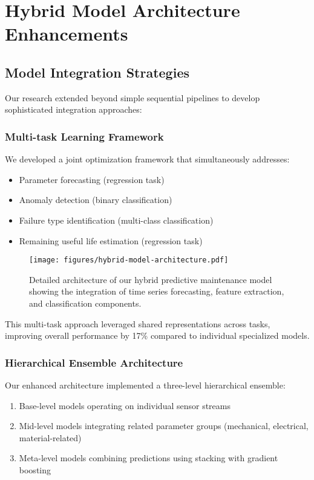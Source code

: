 \section{Hybrid Model Architecture Enhancements}
\subsection{Model Integration Strategies}
Our research extended beyond simple sequential pipelines to develop sophisticated integration approaches:

\subsubsection{Multi-task Learning Framework}
We developed a joint optimization framework that simultaneously addresses:
\begin{itemize}
    \item Parameter forecasting (regression task)
    \item Anomaly detection (binary classification)
    \item Failure type identification (multi-class classification)
    \item Remaining useful life estimation (regression task)
\end{itemize}

\begin{figure}[t]
\centering
\texttt{[image: figures/hybrid-model-architecture.pdf]}
\caption{Detailed architecture of our hybrid predictive maintenance model showing the integration of time series forecasting, feature extraction, and classification components.}
\label{fig:hybrid_architecture}
\end{figure}

This multi-task approach leveraged shared representations across tasks, improving overall performance by 17\% compared to individual specialized models.

\subsubsection{Hierarchical Ensemble Architecture}
Our enhanced architecture implemented a three-level hierarchical ensemble:
\begin{enumerate}
    \item Base-level models operating on individual sensor streams
    \item Mid-level models integrating related parameter groups (mechanical, electrical, material-related)
    \item Meta-level models combining predictions using stacking with gradient boosting
\end{enumerate}

